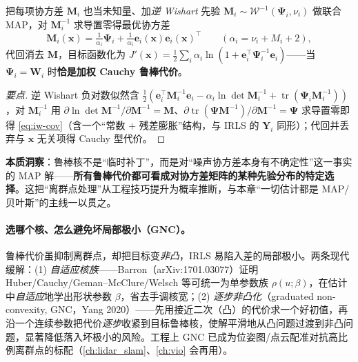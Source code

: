 \begin{theorem}[鲁棒核 $=$ 协方差逆 Wishart 先验下的 MAP \texorpdfstring{$\star$}{(选读)}]\label{thm:robust-iw}
把每项协方差 $\mathbf{M}_i$ 也当未知量、加\emph{逆 Wishart} 先验 $\mathbf{M}_i\sim\mathcal{W}^{-1}(\boldsymbol{\Psi}_i,\nu_i)$ 做联合 MAP，对 $\mathbf{M}_i^{-1}$ 求导置零得最优协方差
\begin{equation}
  \mathbf{M}_i(\mathbf{x})=\tfrac{1}{\alpha_i}\boldsymbol{\Psi}_i+\tfrac{1}{\alpha_i}\mathbf{e}_i(\mathbf{x})\mathbf{e}_i(\mathbf{x})^\top\qquad(\alpha_i=\nu_i+M_i+2),
  \label{eq:iw-cov}
\end{equation}
代回消去 $\mathbf{M}$，目标函数化为 $J'(\mathbf{x})=\tfrac12\sum_i\alpha_i\ln(1+\mathbf{e}_i^\top\boldsymbol{\Psi}_i^{-1}\mathbf{e}_i)$——当 $\boldsymbol{\Psi}_i=\mathbf{W}_i$ 时\textbf{恰是加权 Cauchy 鲁棒代价}。
\end{theorem}
\begin{proof}[要点]
逆 Wishart 负对数似然含 $\tfrac12(\mathbf{e}_i^\top\mathbf{M}_i^{-1}\mathbf{e}_i-\alpha_i\ln\det\mathbf{M}_i^{-1}+\operatorname{tr}(\boldsymbol{\Psi}_i\mathbf{M}_i^{-1}))$，对 $\mathbf{M}_i^{-1}$ 用 $\partial\ln\det\mathbf{M}^{-1}/\partial\mathbf{M}^{-1}=\mathbf{M}$、$\partial\operatorname{tr}(\boldsymbol{\Psi}\mathbf{M}^{-1})/\partial\mathbf{M}^{-1}=\boldsymbol{\Psi}$ 求导置零即得 \cref{eq:iw-cov}（含一个“常数 $+$ 残差膨胀”结构，与 IRLS 的 $\mathbf{Y}_i$ 同形）；代回并丢弃与 $\mathbf{x}$ 无关项得 Cauchy 型代价\cite{barfoot2024state}。
\end{proof}

\begin{insight}
\textbf{本质洞察}：鲁棒核不是“临时补丁”，而是对“噪声协方差本身有不确定性”这一事实的 MAP 解——\textbf{所有鲁棒代价都可看成对协方差矩阵的某种先验分布的特定选择}\cite{barfoot2024state}。这把“离群点处理”从工程技巧提升为概率推断，与本章“一切估计都是 MAP/贝叶斯”的主线一以贯之。
\end{insight}

\paragraph{选哪个核、怎么避免坏局部极小（GNC）。}
鲁棒代价虽抑制离群点，却把目标变\emph{非凸}，IRLS 易陷入差的局部极小。两条现代缓解\cite{barfoot2024state}：(1) \emph{自适应核族}——Barron（arXiv:1701.03077）证明 Huber/Cauchy/Geman--McClure/Welsch 等可统一为单参数族 $\rho(u;\beta)$，在估计中\emph{自适应}地学出形状参数 $\beta$，省去手调核宽\cite{barron2019general}；(2) \emph{逐步非凸化}（graduated non-convexity, GNC，Yang 2020\cite{yang2020gnc}）——先用接近二次（凸）的代价求一个好初值，再沿一个连续参数把代价\emph{逐步}收紧到目标鲁棒核，使解平滑地从凸问题过渡到非凸问题，显著降低落入坏极小的风险。工程上 GNC 已成为位姿图/点云配准对抗高比例离群点的标配（\cref{ch:lidar_slam}、\cref{ch:vio} 会再用）。

